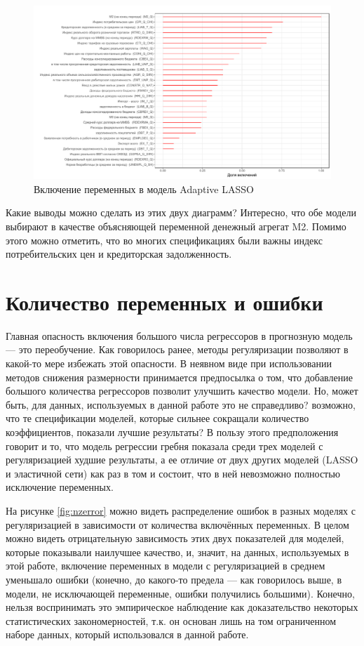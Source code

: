\begin{figure}[h]
    \centering
    \includegraphics[width = \textwidth]{nzlollipop1.pdf}
    \caption{Включение переменных в модель Adaptive LASSO}
    \label{fig:lp1}
\end{figure}



Какие выводы можно сделать из этих двух диаграмм? Интересно, что обе модели выбирают в качестве объясняющей переменной денежный агрегат M2. Помимо этого можно отметить, что во многих спецификациях были важны индекс потребительских цен и кредиторская задолженность.



\section{Количество переменных и ошибки}

Главная опасность включения большого числа регрессоров в прогнозную модель --- это переобучение. Как говорилось ранее, методы регуляризации позволяют в какой-то мере избежать этой опасности. В неявном виде при использовании методов снижения размерности принимается предпосылка о том, что добавление большого количества регрессоров позволит улучшить качество модели. Но, может быть, для данных, используемых в данной работе это не справедливо? возможно, что те спецификации моделей, которые сильнее сокращали количество коэффициентов, показали лучшие результаты? В пользу этого предположения говорит и то, что модель регрессии гребня показала среди трех моделей с регуляризацией худшие результаты, а ее отличие от двух других моделей (LASSO и эластичной сети) как раз в том и состоит, что в ней невозможно полностью исключение переменных.

На рисунке \ref{fig:nzerror} можно видеть распределение ошибок в разных моделях с регуляризацией в зависимости от количества включённых переменных. В целом можно видеть отрицательную зависимость этих двух показателей для моделей, которые показывали наилучшее качество, и, значит, на данных, используемых в этой работе, включение переменных в модели с регуляризацией в среднем уменьшало ошибки (конечно, до какого-то предела --- как говорилось выше, в модели, не исключающей переменные, ошибки получились большими). Конечно, нельзя воспринимать это эмпирическое наблюдение как доказательство некоторых статистических закономерностей, т.к. он основан лишь на том ограниченном наборе данных, который использовался в данной работе.


